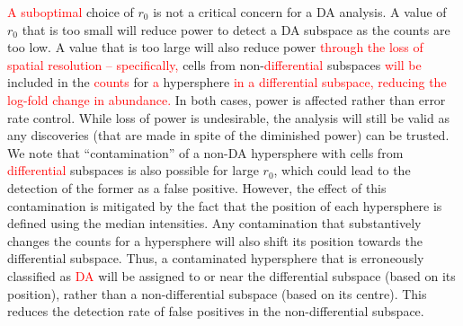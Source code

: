 \documentclass{article}
\newcommand\revised[1]{\textcolor{red}{#1}}
\begin{document}
\revised{A suboptimal} choice of $r_0$ is not a critical concern for a DA analysis.
A value of $r_0$ that is too small will reduce power to detect a DA subspace as the counts are too low.
A value that is too large will also reduce power \revised{through the loss of spatial resolution -- specifically,} cells from non-\revised{differential} subspaces \revised{will be} included in the \revised{counts} for \revised{a} hypersphere \revised{in a differential subspace, reducing the log-fold change in abundance.}
In both cases, power is affected rather than error rate control.
While loss of power is undesirable, the analysis will still be valid as any discoveries (that are made in spite of the diminished power) can be trusted.
We note that ``contamination'' of a non-DA hypersphere with cells from \revised{differential} subspaces is also possible for large $r_0$, which could lead to the detection of the former as a false positive.
However, the effect of this contamination is mitigated by the fact that the position of each hypersphere is defined using the median intensities.
Any contamination that substantively changes the counts for a hypersphere will also shift its position towards the differential subspace.
Thus, a contaminated hypersphere that is erroneously classified as \revised{DA} will be assigned to or near the differential subspace (based on its position), rather than a non-differential subspace (based on its centre).
This reduces the detection rate of false positives in the non-differential subspace.
\end{document}
